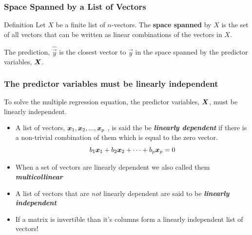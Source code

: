 \documentclass{beamer}
\begin{document}
\begin{frame}
  \frametitle{Space Spanned by a List of Vectors}


\begin{block}{Definition}
Let $X$ be a finite list of $n$-vectors. The \textbf{space spanned} by $X$ is the set of all vectors that can be written as linear combinations of the vectors in $X$.
\end{block}

\smallskip

\begin{center}
\end{center}

\smallskip

The prediction, $\hat{\vec{y}}$ is the closest vector to $\vec{y}$ in the space spanned by the predictor variables, $\bm{X}$.

\end{frame}






\begin{frame}
  \frametitle{The predictor variables must be linearly independent}

To solve the multiple regression equation, the predictor variables, $\bm{X}$, must be linearly independent.

\begin{itemize}

\item A list of vectors, $\bm{x}_1, \bm{x}_2, ..., \bm{x}_p$ , is said the be \emph{\textbf{linearly dependent}} if there is a non-trivial combination of them which is equal to the zero vector.
\[
 b_1 \bm{x}_1 + b_2 \bm{x}_2 + \cdots + b_p \bm{x}_p = 0
\]

\item When a set of vectors are linearly dependent we also called them  \emph{\textbf{multicollinear}}

\item A list of vectors that are \emph{not} linearly dependent are said to be \emph{\textbf{linearly independent}}

\item  If a matrix is invertible than it's columns form a linearly independent list of vectors!

\end{itemize}


\end{frame}
\end{document}

